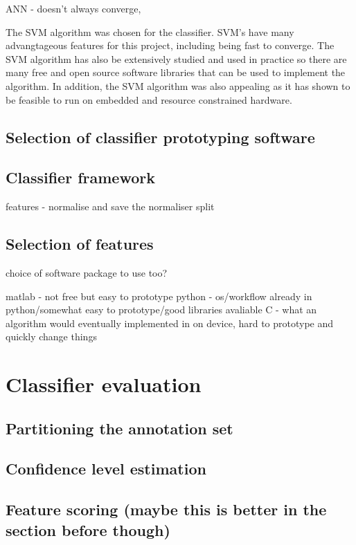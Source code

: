 ANN - doesn't always converge, 

The SVM algorithm was chosen for the classifier. SVM's have many advangtageous features for this project, including being fast to converge. The SVM algorithm has also be extensively studied and used in practice so there are many free and open source software libraries that can be used to implement the algorithm. In addition, the SVM algorithm was also appealing as it has shown to be feasible to run on embedded and resource constrained hardware. 

\subsection{Selection of classifier prototyping software}


\subsection{Classifier framework}

features - normalise and save the normaliser
split

\subsection{Selection of features}






choice of software package to use too?

matlab - not free but easy to prototype
python - os/workflow already in python/somewhat easy to prototype/good libraries avaliable
C - what an algorithm would eventually implemented in on device, hard to prototype and quickly change things




\section{Classifier evaluation}


\subsection{Partitioning the annotation set}


\subsection{Confidence level estimation}

\subsection{Feature scoring (maybe this is better in the section before though)}
